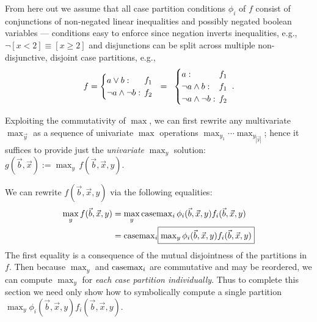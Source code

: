 From here out we assume that all case partition conditions $\phi_i$ of
$f$ consist of conjunctions of non-negated linear inequalities and
possibly negated boolean variables --- conditions easy to enforce
since 
negation
inverts inequalities, e.g., $\neg [x < 2] \equiv [x \geq 2]$
and disjunctions can be split across multiple non-disjunctive, 
disjoint case partitions, e.g., {\footnotesize
\begin{equation*}
f = 
\begin{cases}
a \lor b: & \sqm f_1 \\ 
\neg a \land \neg b: & \sqm f_2\\ 
\end{cases} 
\; \; =  \; \;
\begin{cases}
a: & \sqm f_1 \\ 
\neg a \land b: & \sqm f_1 \\ 
\neg a \land \neg b: & \sqm f_2\\ 
\end{cases} \; .
\end{equation*}}

Exploiting the commutativity of $\max$, we can first rewrite any
multivariate $\max_{\vec{y}}$ as a sequence of univariate $\max$
operations $\max_{y_1} \cdots \max_{y_{|\vec{y}|}}$; hence it suffices
to provide just the \emph{univariate} $\max_y$ solution: 
$g(\vec{b},\vec{x}) := \max_{y} \, f(\vec{b},\vec{x},y)$.

We can rewrite $f(\vec{b},\vec{x},y)$ via 
the following equalities:
{\footnotesize
\begin{align}
\max_y f(\vec{b},\vec{x},y) & = 
\max_y \mathrm{casemax}_i \, \phi_i(\vec{b},\vec{x},y) f_i(\vec{b},\vec{x},y) \nonumber \\
& = \mathrm{casemax}_i \fbox{$\max_y \phi_i(\vec{b},\vec{x},y) f_i(\vec{b},\vec{x},y)$} \label{eq:casemax_max}
\end{align}}
The first equality is a consequence of the mutual 
disjointness of the partitions in $f$.  Then because 
$\max_y$ and $\mathrm{casemax}_i$ are commutative and may be reordered,
we can compute $\max_y$ for \emph{each case partition
individually}.  Thus to complete this section we need only
show how to symbolically compute a single partition 
$\max_y \phi_i(\vec{b},\vec{x},y) f_i(\vec{b},\vec{x},y)$.

